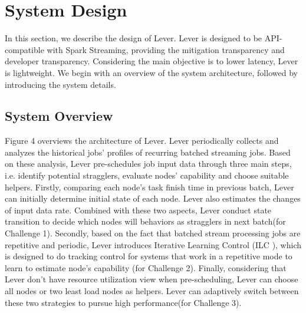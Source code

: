 \documentclass[10pt,conference,compsocconf,letterpaper]{IEEEtran}
\begin{document}
\section{System Design}

  In this section, we describe the design of Lever. Lever is designed to be API-compatible with Spark Streaming, providing the mitigation transparency and developer transparency. Considering the main objective is to lower latency, Lever is lightweight. We begin with an overview of the system architecture, followed by introducing the system details.

\subsection{System Overview}

  Figure 4 overviews the architecture of Lever. Lever periodically collects and analyzes the historical jobs' profiles of recurring batched streaming jobs. Based on these analysis, Lever pre-schedules job input data through three main steps, i.e. identify potential stragglers, evaluate nodes' capability and choose suitable helpers. Firstly, comparing each node's task finish time in previous batch, Lever can initially determine initial state of each node. Lever also estimates the changes of input data rate. Combined with these two aspects, Lever conduct state transition to decide which nodes will behaviors as stragglers in next batch(for Challenge 1). Secondly, based on the fact that batched stream processing jobs are repetitive and periodic, Lever introduces Iterative Learning Control (ILC \cite{Arimoto}), which is designed to do tracking control for systems that work in a repetitive mode to learn to estimate node's capability (for Challenge 2). Finally, considering that Lever don't have resource utilization view when pre-scheduling, Lever can choose all nodes or two least load nodes as helpers. Lever can adaptively switch between these two strategies to pursue high performance(for Challenge 3).
\end{document}
